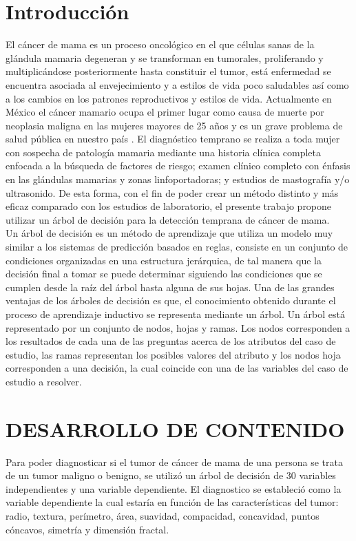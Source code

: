 \documentclass[letterpaper, 10 pt, conference]{ieeeconf}
\begin{document}
\section{Introducción}
El cáncer de mama es un proceso oncológico en el que células sanas de la glándula mamaria degeneran y se transforman en tumorales, proliferando y multiplicándose posteriormente hasta constituir el tumor, está enfermedad se encuentra asociada al envejecimiento y a estilos de vida poco saludables así como a los cambios en los patrones reproductivos y estilos de vida. Actualmente en México el cáncer mamario ocupa el primer lugar como causa de muerte por neoplasia maligna en las mujeres mayores de 25 años y es un grave problema de salud pública en nuestro país \cite{4}. El diagnóstico temprano se realiza a toda mujer con sospecha de patología mamaria mediante una historia clínica completa enfocada a la búsqueda de factores de riesgo; examen clínico completo con énfasis en las glándulas mamarias y zonas linfoportadoras; y estudios de mastografía y/o ultrasonido. De esta forma, con el fin de poder crear un método distinto y más eficaz comparado con los estudios de laboratorio, el presente trabajo propone utilizar un árbol de decisión para la detección temprana de cáncer de mama.\\ Un árbol de decisión es un método de aprendizaje que utiliza un modelo muy similar a los sistemas de predicción basados en reglas, consiste en un conjunto de condiciones organizadas en una estructura jerárquica, de tal manera que la decisión final a tomar se puede determinar siguiendo las condiciones que se cumplen desde la raíz del árbol hasta alguna de sus hojas. Una de las grandes ventajas de los árboles de decisión es que, el conocimiento obtenido durante el proceso de aprendizaje inductivo se representa mediante un árbol. Un árbol está representado por un conjunto de nodos, hojas y ramas. Los nodos corresponden a los resultados de cada una de las preguntas acerca de los atributos del caso de estudio, las ramas representan los posibles valores del atributo y los nodos hoja corresponden a una decisión, la cual coincide con una de las variables del caso de estudio a resolver.\\

\section{DESARROLLO DE CONTENIDO}

Para poder diagnosticar si el tumor de cáncer de mama de una persona se trata de un tumor maligno o benigno, se utilizó un árbol de decisión de 30 variables independientes y una variable dependiente. El diagnostico se estableció como la variable dependiente la cual estaría en función de las características del tumor: radio, textura, perímetro, área, suavidad, compacidad, concavidad, puntos cóncavos, simetría y dimensión fractal.\\
\end{document}
